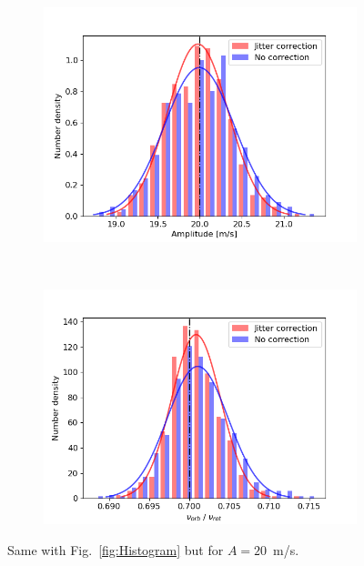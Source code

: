 \begin{figure}[htbp]
\begin{subfigure}[b]{0.49\textwidth}
        \includegraphics[width=\textwidth]{./Figures/Methods/Histogram_new1_p20_sn2000.png}
    \end{subfigure}
	~
    \begin{subfigure}[b]{0.49\textwidth}
        \includegraphics[width=\textwidth]{./Figures/Methods/Histogram_new2_p20_sn2000.png}
    \end{subfigure}	       
    \caption[Histogram of recovered orbital parameters ($A = 20$~m/s)]
    {Same with Fig.~\ref{fig:Histogram} but for $A = 20$~m/s.}
\label{fig:Histogram20}
\end{figure}    

